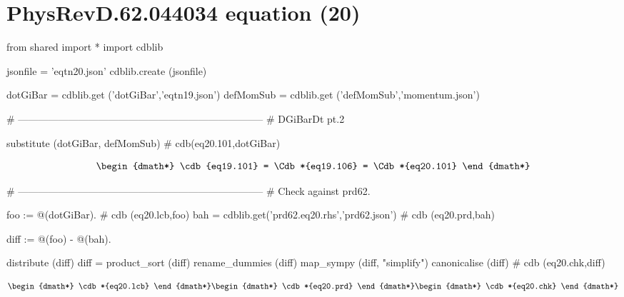 \documentclass[12pt]{cdblatex}
\begin{document}
\section*{PhysRevD.62.044034 equation (20)}

\begin{cadabra}
   from shared import *
   import cdblib

   jsonfile = 'eqtn20.json'
   cdblib.create (jsonfile)

   dotGiBar = cdblib.get ('dotGiBar','eqtn19.json')
   defMomSub = cdblib.get ('defMomSub','momentum.json')

   # --------------------------------------------------------------------------
   # DGiBarDt pt.2

   substitute (dotGiBar, defMomSub)      # cdb(eq20.101,dotGiBar)
\end{cadabra}



\begin{dgroup*}[spread=5pt]
   \begin{dmath*}
      \cdb{eq19.101}
         = \Cdb*{eq19.106}
         = \Cdb*{eq20.101}
   \end{dmath*}
\end{dgroup*}

\clearpage

\begin{cadabra}
   # --------------------------------------------------------------------------
   # Check against prd62.

   foo := @(dotGiBar).                                  # cdb (eq20.lcb,foo)
   bah  = cdblib.get('prd62.eq20.rhs','prd62.json')     # cdb (eq20.prd,bah)

   diff := @(foo) - @(bah).

   distribute     (diff)
   diff = product_sort (diff)
   rename_dummies (diff)
   map_sympy      (diff, "simplify")
   canonicalise   (diff)                                # cdb (eq20.chk,diff)
\end{cadabra}


\begin{dgroup*}
   \begin{dmath*} \cdb*{eq20.lcb} \end{dmath*}
   \begin{dmath*} \cdb*{eq20.prd} \end{dmath*}
   \begin{dmath*} \cdb*{eq20.chk} \end{dmath*}
\end{dgroup*}
\end{document}
